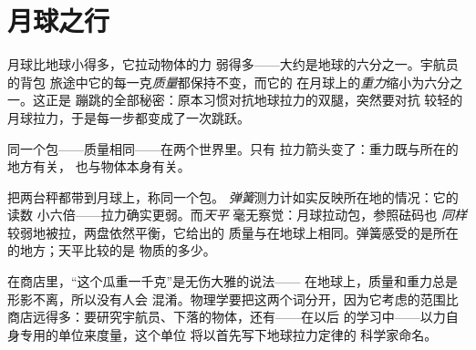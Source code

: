 \section{月球之行}

\begin{example}[月球的拉力较弱]\label{ex:g4:weight-and-mass:moon}
月球比地球小得多，它拉动物体的力
弱得多——大约是地球的六分之一。宇航员的背包
旅途中它的每一克\emph{质量}都保持不变，而它的
在月球上的\emph{重力}缩小为六分之一。这正是
蹦跳的全部秘密：原本习惯对抗地球拉力的双腿，突然要对抗
较轻的月球拉力，于是每一步都变成了一次跳跃。
\end{example}

\begin{omfigure}

{\small 同一个包——质量相同——在两个世界里。只有
拉力箭头变了：重力既与所在的地方有关，
也与物体本身有关。}
\end{omfigure}

\begin{example}[月球上的两台秤]\label{ex:g4:weight-and-mass:twoscales}
把两台秤都带到月球上，称同一个包。
\emph{弹簧}测力计如实反映所在地的情况：它的读数
小六倍——拉力确实更弱。而\emph{天平}
毫无察觉：月球拉动包，参照砝码也
\emph{同样}较弱地被拉，两盘依然平衡，它给出的
质量与在地球上相同。弹簧感受的是所在的地方；天平比较的是
物质的多少。
\end{example}

\begin{remark}[日常用语与物理用语]\label{rem:g4:weight-and-mass:words}
在商店里，“这个瓜重一千克”是无伤大雅的说法——
在地球上，质量和重力总是形影不离，所以没有人会
混淆。物理学要把这两个词分开，因为它考虑的范围比
商店远得多：要研究宇航员、下落的物体，还有——在以后
的学习中——以力自身专用的单位来度量，这个单位
将以首先写下地球拉力定律的
科学家命名。
\end{remark}


